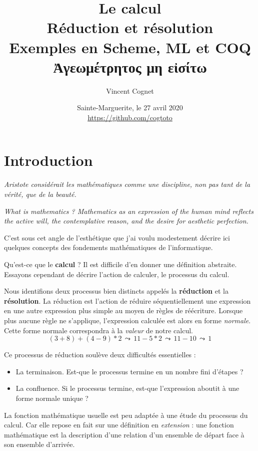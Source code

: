 \documentclass[11pt]{book}
\title{Le calcul \\
     Réduction et résolution \\
	 Exemples en Scheme, ML et COQ \\ \vspace{1cm}
   \textgreek{Ἀγεωμέτρητος μη  εἰσίτω } \\
      }
\author{Vincent Cognet}
\date{Sainte-Marguerite, le 27 avril 2020 \\
      \url{https://github.com/cogtoto}}
\begin{document}
\maketitle
\tableofcontents

\chapter*{Introduction}

\textit{Aristote considérait les mathématiques comme une discipline, non pas tant de la vérité, que de la beauté.}
\cite{ab}


\textit{What is mathematics ? Mathematics as an expression of the human mind reflects
the active will, the contemplative reason, and the desire for aesthetic perfection.} \cite{wm}


C'est sous cet angle de l'esthétique que j'ai voulu modestement décrire ici quelques concepts 
 des fondements mathématiques de l'informatique.

 \vspace{0.5cm}

Qu'est-ce que le \textbf{calcul} ? Il est difficile d'en donner une définition abstraite. Essayons cependant de 
décrire l'action de calculer, le processus du calcul. 

Nous identifions deux processus bien distincts appelés la \textbf{réduction} et la \textbf{résolution}.
La réduction est l'action de réduire séquentiellement une expression en une autre expression plus simple
au moyen de règles de réécriture. Lorsque plus aucune règle ne s'applique, l'expression calculée est alors en forme
\textit{normale}. Cette forme normale correspondra à la \textit{valeur} de notre calcul.
$$(3+8)+(4-9)*2 \,\leadsto\,  11 -5*2 \, \leadsto\, 11 -10 \,\leadsto\, 1 $$

Ce processus de réduction soulève deux difficultés essentielles : 
\begin{itemize}
	\item La terminaison. Est-que le processus termine en un nombre fini d'étapes ?
	\item La confluence. Si le processus termine, est-que l'expression aboutit à une forme normale unique ?
\end{itemize}
\vspace{0.3cm}
La fonction mathématique usuelle est peu adaptée à une étude du processus du calcul. Car elle
repose en fait sur une définition en \textit{extension} : une fonction mathématique est la 
description d'une relation d'un ensemble de départ face à son ensemble d'arrivée.
\end{document}
